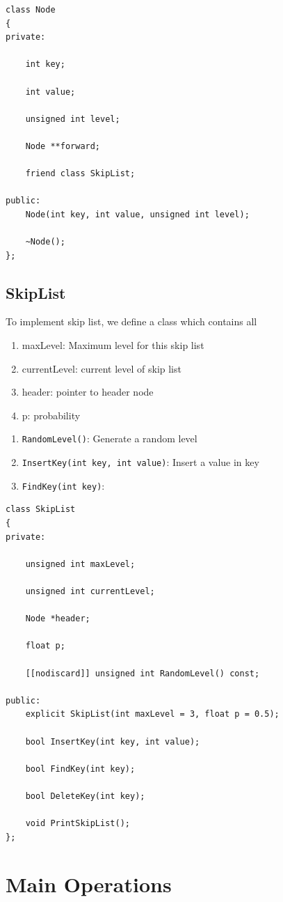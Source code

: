\documentclass[10pt,english, openany]{book}
\begin{document}
\begin{lstlisting}
class Node
{
private:
    
    int key;
    
    int value;
    
    unsigned int level;
    
    Node **forward;

    friend class SkipList;

public:
    Node(int key, int value, unsigned int level);

    ~Node();
};
\end{lstlisting}
\subsection{SkipList}
To implement skip list, we define a class which contains all 
\begin{enumerate}
	\item maxLevel: Maximum level for this skip list
	\item currentLevel: current level of skip list
	\item header: pointer to header node
	\item p: probability
\end{enumerate}
\begin{enumerate}
	\item \texttt{RandomLevel()}: Generate a random level 
	\item \texttt{InsertKey(int key, int value)}: Insert a value in key
	\item \texttt{FindKey(int key)}: 
\end{enumerate}
\begin{lstlisting}
class SkipList
{
private:

    unsigned int maxLevel;
    
    unsigned int currentLevel;

    Node *header;
 
    float p;

    [[nodiscard]] unsigned int RandomLevel() const;

public:
    explicit SkipList(int maxLevel = 3, float p = 0.5);

    bool InsertKey(int key, int value);

    bool FindKey(int key);

    bool DeleteKey(int key);

    void PrintSkipList();
};
\end{lstlisting}
\section{Main Operations}
\end{document}
